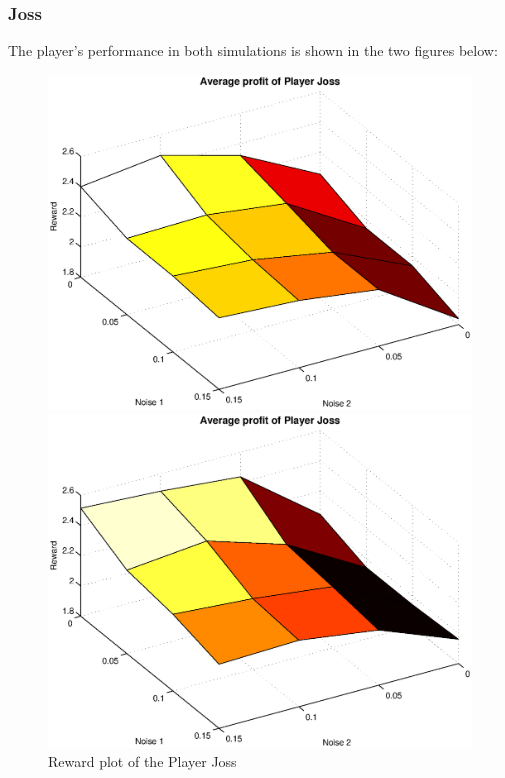 \documentclass[11pt,twoside]{article}
\begin{document}
\subsubsection{Joss}
The player's performance in both simulations is shown in the two figures below:
\begin{figure}[h]

\begin{minipage}[hbt]{0.65\textwidth}
	\centering
	\includegraphics[width=\textwidth]{pics/simulation1/Reward_vs_Noise_of_Player_Joss}
\end{minipage}
\hfill
\begin{minipage}[hbt]{0.3\textwidth}
	\centering
	\includegraphics[width=\textwidth]{pics/simulation2/Reward_vs_Noise_of_Player_Joss}
\end{minipage}
	\caption{Reward plot of the Player Joss}
	\label{pic player joss}
\end{figure}
\end{document}
